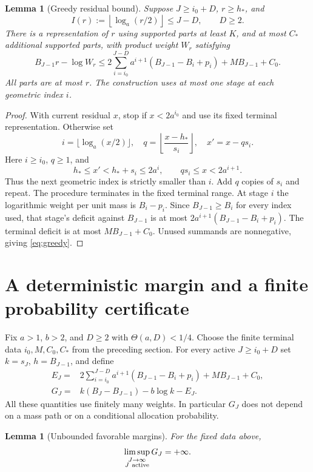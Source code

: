 \documentclass[11pt]{article}
\newtheorem{lemma}[theorem]{Lemma}
\theoremstyle{remark}\newtheorem{remark}[theorem]{Remark}
\begin{document}
\begin{lemma}[Greedy residual bound]\label{lem:greedy}
Suppose $J\ge i_0+D$, $r\ge h_*$, and
\[
 I(r):=\left\lfloor\log_a(r/2)\right\rfloor\le J-D,
 \qquad D\ge2.
\]
There is a representation of $r$ using supported parts at least $K$, and
at most $C_*$ additional supported parts, with product weight $W_r$ satisfying
\begin{equation}\label{eq:greedy}
 B_{J-1}r-\log W_r
 \le 2\sum_{i=i_0}^{J-D}a^{i+1}
       (B_{J-1}-B_i+p_i)+MB_{J-1}+C_0.
\end{equation}
All parts are at most $r$. The construction uses at most one stage at each
geometric index $i$.
\end{lemma}

\begin{proof}
With current residual $x$, stop if $x<2a^{i_0}$ and use its fixed terminal
representation. Otherwise set
\[
 i=\lfloor\log_a(x/2)\rfloor,\quad
 q=\left\lfloor\frac{x-h_*}{s_i}\right\rfloor,\quad
 x'=x-qs_i.
\]
Here $i\ge i_0$, $q\ge1$, and
\[
 h_*\le x'<h_*+s_i\le2a^i,\qquad qs_i\le x<2a^{i+1}.
\]
Thus the next geometric index is strictly smaller than $i$. Add $q$ copies
of $s_i$ and repeat. The procedure terminates in the fixed terminal range.
At stage $i$ the logarithmic weight per unit mass is $B_i-p_i$.
Since $B_{J-1}\ge B_i$ for every index used, that stage's deficit against
$B_{J-1}$ is at most
$2a^{i+1}(B_{J-1}-B_i+p_i)$. The terminal deficit is at most
$MB_{J-1}+C_0$. Unused summands are nonnegative, giving \eqref{eq:greedy}.
\end{proof}

\section{A deterministic margin and a finite probability certificate}
Fix $a>1$, $b>2$, and $D\ge2$ with $\Theta(a,D)<1/4$. Choose the finite
terminal data $i_0,M,C_0,C_*$ from the preceding section. For every active
$J\ge i_0+D$ set $k=s_J$, $h=B_{J-1}$, and define
\begin{align}
 E_J={}&2\sum_{i=i_0}^{J-D}a^{i+1}(B_{J-1}-B_i+p_i)
             +MB_{J-1}+C_0,\label{eq:energy}\\
 G_J={}&k(B_J-B_{J-1})-b\log k-E_J.\label{eq:margin}
\end{align}
All these quantities use finitely many weights. In particular $G_J$ does
not depend on a mass path or on a conditional allocation probability.

\begin{lemma}[Unbounded favorable margins]\label{lem:margin}
For the fixed data above,
\begin{equation}\label{eq:marginlimsup}
 \limsup_{\substack{J\to\infty\\J\ {\rm active}}}G_J=+\infty.
\end{equation}
\end{lemma}
\end{document}
